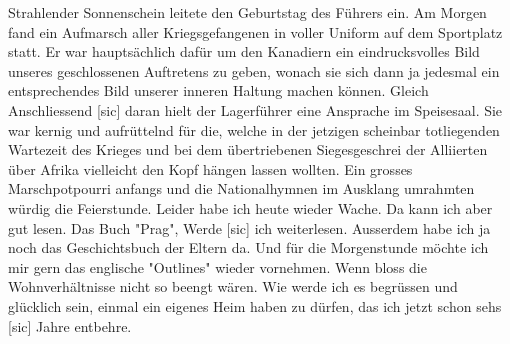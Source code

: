 \def\day{20. April 1943}
\mktitle

Strahlender Sonnenschein leitete den Geburtstag des F\"{u}hrers ein.
Am Morgen fand ein Aufmarsch aller Kriegsgefangenen in voller Uniform auf dem Sportplatz statt.
Er war haupts\"{a}chlich daf\"{u}r um den Kanadiern ein eindrucksvolles Bild unseres geschlossenen Auftretens zu geben, wonach sie sich dann ja jedesmal ein entsprechendes Bild unserer inneren Haltung machen k\"{o}nnen.
Gleich Anschliessend{\color{red} [sic] } daran hielt der Lagerf\"{u}hrer eine Ansprache im Speisesaal.
Sie war kernig und aufr\"{u}ttelnd f\"{u}r die, welche in der jetzigen scheinbar totliegenden Wartezeit des Krieges und bei dem \"{u}bertriebenen Siegesgeschrei der Alliierten  \"{u}ber Afrika vielleicht den Kopf h\"{a}ngen lassen wollten.
Ein grosses Marschpotpourri anfangs und die Nationalhymnen im Ausklang umrahmten w\"{u}rdig die Feierstunde.
Leider habe ich heute wieder Wache.
Da kann ich aber gut lesen.
Das Buch "Prag", Werde{\color{red} [sic] } ich weiterlesen.
Ausserdem habe ich ja noch das Geschichtsbuch der Eltern da.
Und f\"{u}r die Morgenstunde m\"{o}chte ich mir gern das englische "Outlines" wieder vornehmen.
Wenn bloss die Wohnverh\"{a}ltnisse nicht so beengt w\"{a}ren.
Wie werde ich es begr\"{u}ssen  und gl\"{u}cklich sein, einmal ein eigenes Heim haben zu d\"{u}rfen, das ich jetzt schon sehs{\color{red} [sic] } Jahre entbehre.

\clearpage
